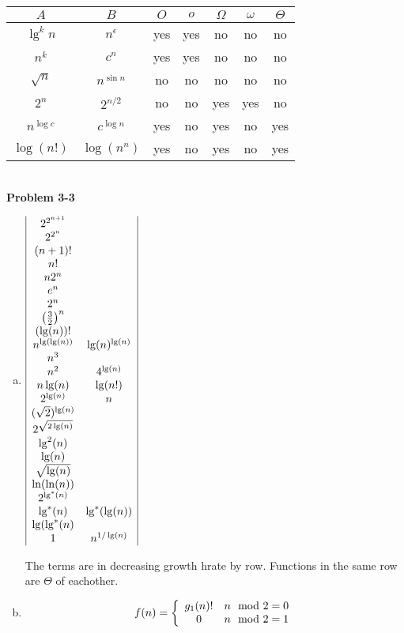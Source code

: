 \documentclass{article}
\begin{document}
\begin{tabular}{c|c|c|c|c|c|c|}
$A$ & $B$ & $O$ & $o$ & $\Omega$ & $\omega$ & $\Theta$ \\ \hline
$\lg^k n$ & $n^\epsilon$ & yes & yes & no & no & no \\ \hline
$n^k$ & $c^n$ & yes & yes & no & no & no \\ \hline 
$\sqrt{n}$ & $n^{\sin n}$ & no & no & no & no & no \\ \hline
$2^n$ & $2^{n/2}$ & no & no & yes & yes & no \\ \hline
$n^{\log c}$ & $c^{\log n}$ & yes & no & yes & no & yes \\ \hline
$\log(n!)$ & $\log(n^n)$ & yes & no & yes & no & yes \\ \hline
\end{tabular} \\

\noindent\textbf{Problem 3-3}\\
\begin{enumerate}[a.]
\item
$
\begin{array}{|c c|}
2^{2^{n+1}}&\\
2^{2^n}&\\
(n+1)!&\\
n!&\\
n2^n&\\
e^n&\\
2^n&\\
\left(\frac{3}{2}\right)^n&\\
(\lg(n))!&\\
 n^{\lg(\lg(n))}&\lg(n)^{\lg(n)}\\
 n^3&\\
  n^2& 4^{\lg(n)}\\
  n\lg(n)&\lg(n!)\\
  2^{\lg(n)}&n\\
  (\sqrt{2})^{\lg(n)}&\\
  2^{\sqrt{2\lg(n)}}&\\
  \lg^2(n)&\\
  \lg(n)&\\
  \sqrt{\lg(n)}&\\
  \ln(\ln(n))&\\
  2^{\lg^*(n)}&\\
  \lg^*(n) &\lg^*(\lg(n))\\
  \lg(\lg^*(n)&\\
  1&n^{1/\lg(n)}

\end{array}
$


The terms are in decreasing growth hrate by row. Functions in the same row are $\Theta$ of eachother.
\item

\[
f(n) = \left\{\begin{array}{c c}g_1(n)!& n\mod 2=0 \\0 &n\mod 2 =1\end{array}\right.
\]
\end{enumerate}
\end{document}
